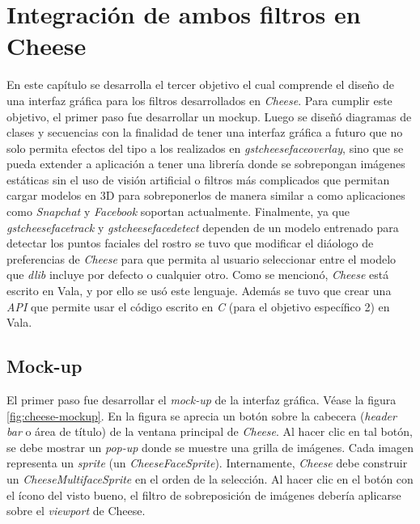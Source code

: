 \documentclass[a4paper,openright,12pt]{report}
\begin{document}
\chapter{Integración de ambos filtros en Cheese}
En este capítulo se desarrolla el tercer objetivo el cual comprende el diseño
de una interfaz gráfica para los filtros desarrollados en \textit{Cheese}. Para
cumplir este objetivo, el primer paso fue desarrollar un mockup. Luego se diseñó
diagramas de clases y secuencias con la finalidad de tener una interfaz gráfica
a futuro que no solo permita efectos del tipo a los realizados en
\textit{gstcheesefaceoverlay}, sino que se pueda extender a aplicación a tener
una librería donde se sobrepongan imágenes estáticas sin el uso de visión
artificial o filtros más complicados que permitan cargar modelos en 3D para
sobreponerlos de manera similar a como aplicaciones como \textit{Snapchat} y
\textit{Facebook} soportan actualmente. Finalmente, ya que
\textit{gstcheesefacetrack} y \textit{gstcheesefacedetect} dependen de un
modelo entrenado para detectar los puntos faciales del rostro se tuvo que
modificar el diáologo de preferencias de \textit{Cheese} para que permita
al usuario seleccionar entre el modelo que \textit{dlib} incluye por defecto o
cualquier otro. Como se mencionó, \textit{Cheese} está escrito en Vala, y por
ello se usó este lenguaje. Además se tuvo que crear una \textit{API} que
permite usar el código escrito en \textit{C} (para el objetivo específico 2) en
Vala.

\section{Mock-up}
El primer paso fue desarrollar el \textit{mock-up} de la interfaz gráfica. Véase
la figura \ref{fig:cheese-mockup}. En la figura se aprecia un botón sobre la
cabecera (\textit{header bar} o área de título) de la ventana principal de
\textit{Cheese}. Al hacer clic en tal botón, se debe mostrar un \textit{pop-up}
donde se muestre una grilla de imágenes. Cada imagen representa un
\textit{sprite} (un \textit{CheeseFaceSprite}). Internamente, \textit{Cheese}
debe construir un \textit{CheeseMultifaceSprite} en el orden de la selección. Al
hacer clic en el botón con el ícono del visto bueno, el filtro de sobreposición
de imágenes debería aplicarse sobre el \textit{viewport} de Cheese.\\
\end{document}
